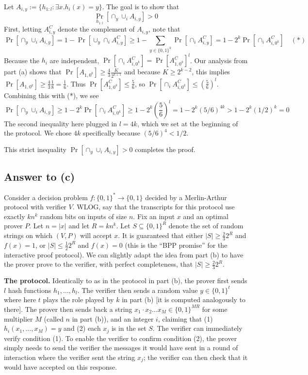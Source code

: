 \documentclass{article}
\begin{document}
Let $A_{i, y} := \{h_{1:l} : \exists x . h_i(x) = y\}$.
The goal is to show that
$$
\Pr_{h_{1:l}}[\cap_y \cup_i A_{i, y}] > 0
$$
First, letting $A_{i, y}^C$ denote the complement of $A_{i, y}$, note that
$$
\Pr[\cap_y \cup_i A_{i, y}] = 1 - \Pr[\cup_y \cap_i A_{i, y}^C]
\geq 1 - \sum_{y \in \{0, 1\}^k} \Pr[\cap_i A_{i, y}^C] = 1 - 2^k\Pr[\cap_i A_{i, 0^k}^C] \quad (*)
$$
Because the $h_i$ are independent, 
$
\Pr[\cap_i A_{i, 0^k}^C]
= \Pr[A_{1, 0^k}^C]^l
$.
Our analysis from part (a) shows that
$
\Pr[A_{1, 0^k}] \geq \frac{4}{3} \frac{K}{2^{k+1}}
$
and because $K \geq 2^{k-2}$, this implies
$
\Pr[A_{1, 0^k}] \geq \frac{4}{3} \frac{1}{8} = \frac{1}{6}
$.
Thus $\Pr[A_{1, 0^k}^C] \leq \frac{5}{6}$, so 
$
\Pr[\cap_i A_{i, 0^k}^C] \leq (\frac{5}{6})^l
$.
Combining this with (*), we see
$$
\Pr[\cap_y \cup_i A_{i, y}] \geq 1 - 2^k \Pr[\cap_i A_{i, 0^k}^C] \geq 1 - 2^k (\frac{5}{6})^l
= 1 - 2^k (5/6)^{4k} > 1 - 2^k (1/2)^k = 0
$$
The second inequality here plugged in $l = 4k$, which we set at the beginning of the protocol.
We chose $4k$ specifically because $(5/6)^4 < 1/2$.

This strict inequality $\Pr[\cap_y \cup_i A_{i, y}] > 0$ completes the proof.

\subsection*{Answer to (c)}
Consider a decision problem $f : \{0, 1\}^* \to \{0, 1\}$ decided by a Merlin-Arthur protocol with verifier $V$.
WLOG, say that the transcripts for this protocol use exactly $kn^k$ random bits on inputs of size $n$.
Fix an input $x$ and an optimal prover $P$.
Let $n = |x|$ and let $R = kn^k$.
Let $S \subseteq \{0, 1\}^{R}$ denote the set of random strings on which $(V, P)$ will accept $x$.
It is guaranteed that either $|S| \geq \frac{2}{3}2^R$ and $f(x) = 1$, or $|S| \leq \frac{1}{2}2^R$ and $f(x) = 0$ (this is the ``BPP promise'' for the interactive proof protocol).
We can slightly adapt the idea from part (b) to have the prover prove to the verifier, with perfect completeness, that $|S| \geq \frac{2}{3}2^R$.

\medskip
\noindent
\textbf{The protocol.}
Identically to as in the protocol in part (b), the prover first sends $l$ hash functions $h_1, \dots, h_l$.
The verifier then sends a random value $y \in \{0, 1\}^t$ where here $t$ plays the role played by $k$ in part (b) [it is computed analogously to there].
The prover then sends back a string $x_1 \cdot x_2 \dots x_{M} \in \{0, 1\}^{MR}$ for some multiplier $M$ (called $n$ in part (b)), and an integer $i$, claiming that (1) $h_i(x_1, \dots, x_M) = y$ and (2) each $x_j$ is in the set $S$.
The verifier can immediately verify condition (1).
To enable the verifier to confirm condition (2), the prover simply needs to send the verifier the messages it would have sent in a round of interaction where the verifier sent the string $x_j$; the verifier can then check that it would have accepted on this response.
\end{document}
